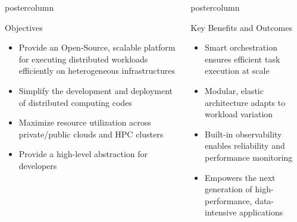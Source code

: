 \begin{frame}[fragile]

  \begin{columns}[T]
    \begin{column}{.49\textwidth}
      \begin{beamercolorbox}[center,wd=\textwidth]{postercolumn}
        \begin{minipage}[T]{.96\textwidth}
            \begin{block}{Objectives}
              \begin{itemize}
                \item Provide an Open-Source, scalable platform for executing distributed workloads efficiently on heterogeneous infrastructures
                \item Simplify the development and deployment of distributed computing codes
                \item Maximize resource utilization across private/public clouds and HPC clusters
                \item Provide a high-level abstraction for developers
              \end{itemize}
            \end{block}
          \end{minipage}
      \end{beamercolorbox}
      \vfill
    \end{column}
    \begin{column}{.49\textwidth}
      \begin{beamercolorbox}[center,wd=\textwidth]{postercolumn}
        \begin{minipage}[T]{.96\textwidth}
          \begin{block}{Key Benefits and Outcomes}
            \begin{itemize}
                \item Smart orchestration ensures efficient task execution at scale
                \item Modular, elastic architecture adapts to workload variation
                \item Built-in observability enables reliability and performance monitoring
                \item Empowers the next generation of high-performance, data-intensive applications
            \end{itemize}
          \end{block}
        \end{minipage}
      \end{beamercolorbox}
    \end{column}
  \end{columns}
  \vfil


\end{frame}
